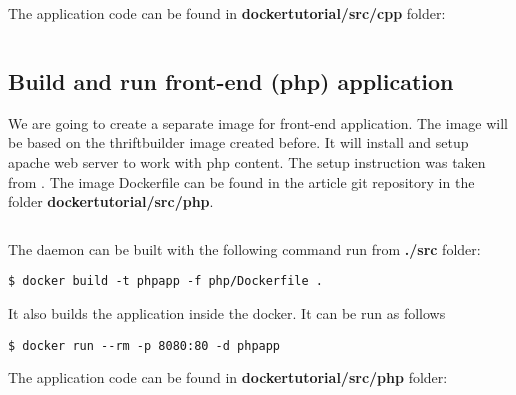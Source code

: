 \documentclass[14pt,a4paper]{article}
\begin{document}
The application code can be found in \textbf{dockertutorial/src/cpp} folder:
\inputminted{c++}{./src/cpp/main.cpp}


\subsection{Build and run front-end (php) application}
We are going to create a separate image for front-end application. The
image will be based on the thriftbuilder image created before.
It will install and setup apache web server to work with php content.
The setup instruction was taken from \cite{apache:php}.
The image Dockerfile can be found in the article git
repository \cite{github:articles_ivanmurashko} in the folder 
\textbf{dockertutorial/src/php}.
\inputminted{shell}{./src/php/Dockerfile}
The daemon can be built with the following command run from
\textbf{./src} folder:
\begin{verbatim}
$ docker build -t phpapp -f php/Dockerfile .
\end{verbatim}
It also builds the application inside the docker. It can be run as
follows
\begin{verbatim}
$ docker run --rm -p 8080:80 -d phpapp
\end{verbatim}

The application code can be found in \textbf{dockertutorial/src/php} folder:
\inputminted{php}{./src/php/index.php}


  
     
\end{document}
